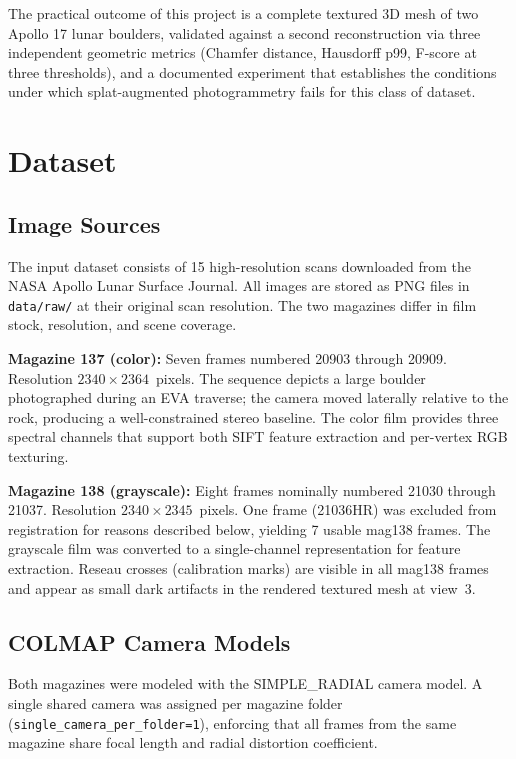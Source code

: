 \documentclass[12pt]{article}
\begin{document}
The practical outcome of this project is a complete textured 3D mesh of two Apollo 17 lunar boulders, validated against a second reconstruction via three independent geometric metrics (Chamfer distance, Hausdorff p99, F-score at three thresholds), and a documented experiment that establishes the conditions under which splat-augmented photogrammetry fails for this class of dataset.

\section{Dataset}
\label{sec:dataset}

\subsection{Image Sources}

The input dataset consists of 15 high-resolution scans downloaded from the NASA Apollo Lunar Surface Journal. All images are stored as PNG files in \texttt{data/raw/} at their original scan resolution. The two magazines differ in film stock, resolution, and scene coverage.

\textbf{Magazine 137 (color):} Seven frames numbered 20903 through 20909. Resolution $2340 \times 2364$~pixels. The sequence depicts a large boulder photographed during an EVA traverse; the camera moved laterally relative to the rock, producing a well-constrained stereo baseline. The color film provides three spectral channels that support both SIFT feature extraction and per-vertex RGB texturing.

\textbf{Magazine 138 (grayscale):} Eight frames nominally numbered 21030 through 21037. Resolution $2340 \times 2345$~pixels. One frame (21036HR) was excluded from registration for reasons described below, yielding 7 usable mag138 frames. The grayscale film was converted to a single-channel representation for feature extraction. Reseau crosses (calibration marks) are visible in all mag138 frames and appear as small dark artifacts in the rendered textured mesh at view~3.

\subsection{COLMAP Camera Models}

Both magazines were modeled with the SIMPLE\_RADIAL camera model. A single shared camera was assigned per magazine folder (\texttt{single\_camera\_per\_folder=1}), enforcing that all frames from the same magazine share focal length and radial distortion coefficient.
\end{document}
